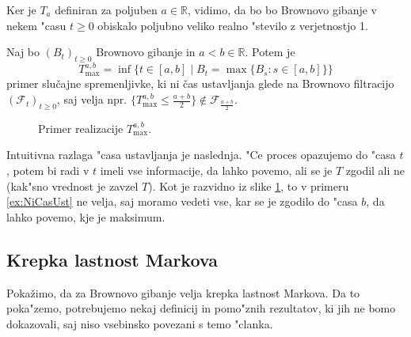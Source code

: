 \documentclass[twoside,11pt]{article}
\begin{document}
\begin{opomba}
    Ker je $T_a$ definiran za poljuben $a \in \mathbb{R}$, vidimo, da bo bo Brownovo gibanje v nekem "casu  $t\geq 0$ obiskalo poljubno veliko realno "stevilo z verjetnostjo 1.
\end{opomba}

\begin{primer}
    Naj bo $(B_t)_{t\geq0}$ Brownovo gibanje in $a < b \in \mathbb{R}$. Potem je
    $$
        T^{a, b}_{\max} = \inf\{t \in [a, b] \mid B_t =\max\{B_s: s\in [a, b]\} \}
    $$
    primer slučajne spremenljivke, ki ni čas ustavljanja glede na Brownovo filtracijo
    $(\mathcal{F}_t)_{t\geq0}$, saj velja npr. $\{T^{a, b}_{\max} \leq \tfrac{a+b}{2}\} \not\in \mathcal{F}_{\tfrac{a+b}{2}}$.
    \label{ex:NiCasUst}
\end{primer}



\begin{figure}[h]
    \centering
    \caption{Primer realizacije $T^{a,b}_{\max}$.}
    \label{fig:slika4}
\end{figure}

Intuitivna razlaga "casa ustavljanja je naslednja. "Ce proces opazujemo do "casa $t$, potem bi radi v $t$ imeli vse informacije, da lahko povemo, 
ali se je $T$ zgodil ali ne (kak"sno vrednost je zavzel $T$). Kot je razvidno iz slike \ref{fig:slika4}, to v primeru \ref{ex:NiCasUst} ne velja, 
saj moramo vedeti vse, kar se je zgodilo do "casa $b$, da lahko povemo, kje je maksimum. 

\subsection{Krepka lastnost Markova}
Pokažimo, da za Brownovo gibanje velja krepka lastnost Markova. Da to poka"zemo, potrebujemo nekaj definicij in pomo"znih rezultatov, ki jih ne bomo dokazovali, saj niso vsebinsko povezani s temo "clanka.
\end{document}
